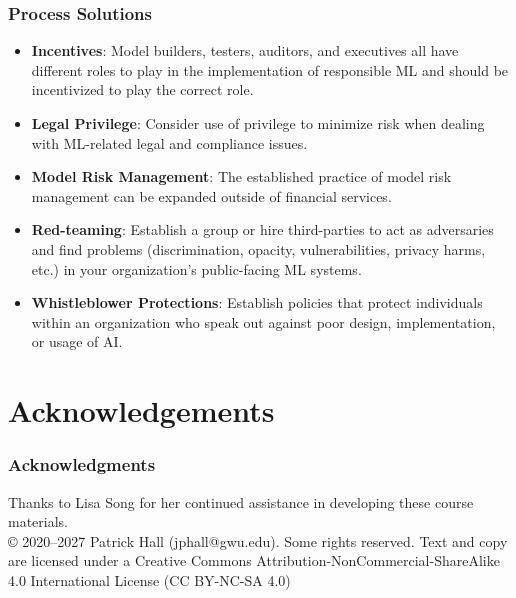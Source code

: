 \documentclass[11pt,
               aspectratio=169,
               hyperref={colorlinks}
               ]{beamer}
\begin{document}
		\begin{frame}
			
			\frametitle{Process Solutions}	
				
			\begin{itemize}
				
				\item \textbf{Incentives}: Model builders, testers, auditors, and executives all have different roles to play in the implementation of responsible ML and should be incentivized to play the correct role.
				
				\item \textbf{Legal Privilege}: Consider use of privilege to minimize risk when dealing with ML-related legal and compliance issues.
				
				\item \textbf{Model Risk Management}: The established practice of model risk management can be expanded outside of financial services.
				
				\item \textbf{Red-teaming}: Establish a group or hire third-parties to act as adversaries and find problems (discrimination, opacity, vulnerabilities, privacy harms, etc.) in your organization's public-facing ML systems.
				
				\item \textbf{Whistleblower Protections}: Establish policies that protect individuals within an organization who speak out against poor design, implementation, or usage of AI. 
				
			\end{itemize}
			
		\end{frame}	

\section{Acknowledgements} 

\begin{frame}
	
	\frametitle{Acknowledgments}
	
	Thanks to Lisa Song for her continued assistance in developing these course materials.\\
	\vspace{10pt}
	© 2020–2027 Patrick Hall (jphall@gwu.edu). Some rights reserved. Text and copy are licensed under a Creative Commons Attribution-NonCommercial-ShareAlike 4.0 International License (CC BY-NC-SA 4.0)  
	
\end{frame}	
\end{document}

